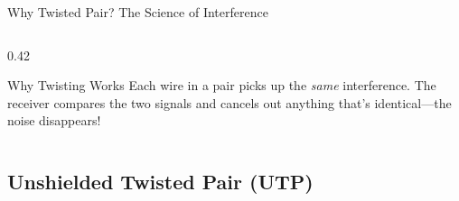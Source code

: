 \documentclass[aspectratio=169]{beamer}  %
\begin{document}
\begin{frame}{Why Twisted Pair? The Science of Interference}
\begin{columns}[T]
\begin{column}{0.42\textwidth}
            \vspace{0.3em}
            \begin{block}{Why Twisting Works}
                \small
                Each wire in a pair picks up the \textit{same} interference. The receiver compares the two signals and cancels out anything that's identical---the noise disappears!
            \end{block}
        \end{column}
    \end{columns}
\end{frame}

\subsection{Unshielded Twisted Pair (UTP)}

\end{document}
